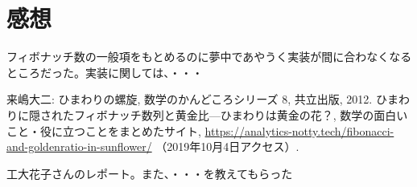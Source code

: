 \documentclass[a4j]{jarticle}
\begin{document}
\section{感想}
フィボナッチ数の一般項をもとめるのに夢中であやうく実装が間に合わなくなるところだった。実装に関しては、・・・


\begin{thebibliography}{99}
 来嶋大二: ひまわりの螺旋, 数学のかんどころシリーズ 8, 共立出版, 2012.
 ひまわりに隠されたフィボナッチ数列と黄金比---ひまわりは黄金の花？, 数学の面白いこと・役に立つことをまとめたサイト, \url{https://analytics-notty.tech/fibonacci-and-goldenratio-in-sunflower/} （2019年10月4日アクセス）.

 工大花子さんのレポート。また、・・・を教えてもらった 

\end{thebibliography}
\end{document}
